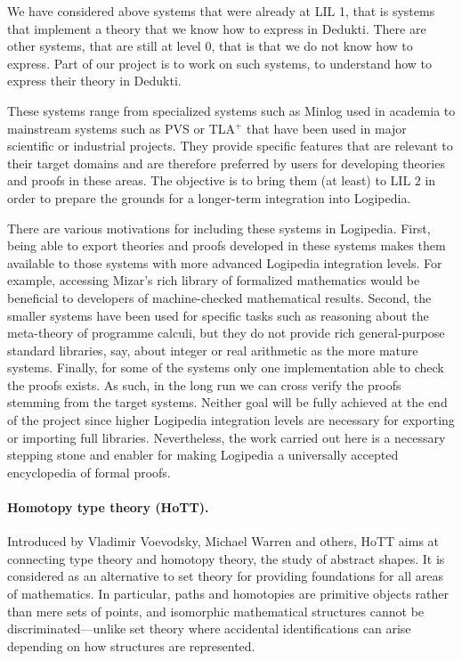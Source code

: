 We have considered above systems that were already at LIL 1, that is
systems that implement a theory that we know how to express in Dedukti.
There are other systems, that are still at level 0, that is that we
do not know how to express. Part of our project is to work on such
systems, to understand how to express their theory in Dedukti.

These systems range from specialized systems such as Minlog
used in academia to mainstream systems such as PVS or TLA$^+$ that
have been used in major scientific or industrial projects. They
provide specific features that are relevant to their target domains
and are therefore preferred by users for developing theories and
proofs in these areas.  The objective is to bring them (at least) to
LIL $2$ in order to prepare the grounds for a longer-term integration
into Logipedia.

There are various motivations for including these systems in
Logipedia. First, being able to export theories and proofs developed
in these systems makes them available to those systems with more
advanced Logipedia integration levels. For example, accessing Mizar's
rich library of formalized mathematics would be beneficial to
developers of machine-checked mathematical results. Second, the
smaller systems have been used for specific tasks such as reasoning
about the meta-theory of programme calculi, but they do not provide rich
general-purpose standard libraries, say, about integer or real
arithmetic as the more mature systems. Finally, for some of the
systems only one implementation able to check the proofs exists. As
such, in the long run we can cross verify the proofs stemming from the
target systems.  Neither goal will be fully achieved at the end of the
project since higher Logipedia integration levels are necessary for
exporting or importing full libraries. Nevertheless, the work carried
out here is a necessary stepping stone and enabler
for making Logipedia a universally accepted encyclopedia of formal
proofs.

\paragraph*{Homotopy type theory (HoTT).}
Introduced by Vladimir Voevodsky, Michael Warren and others, HoTT aims at
connecting type theory and homotopy theory, the study of abstract shapes. It is
considered as an alternative to set theory for providing foundations for all
areas of mathematics. In particular, paths and homotopies are primitive objects
rather than mere sets of points, and isomorphic mathematical structures cannot
be discriminated---unlike set theory where accidental identifications can arise
depending on how structures are represented.

